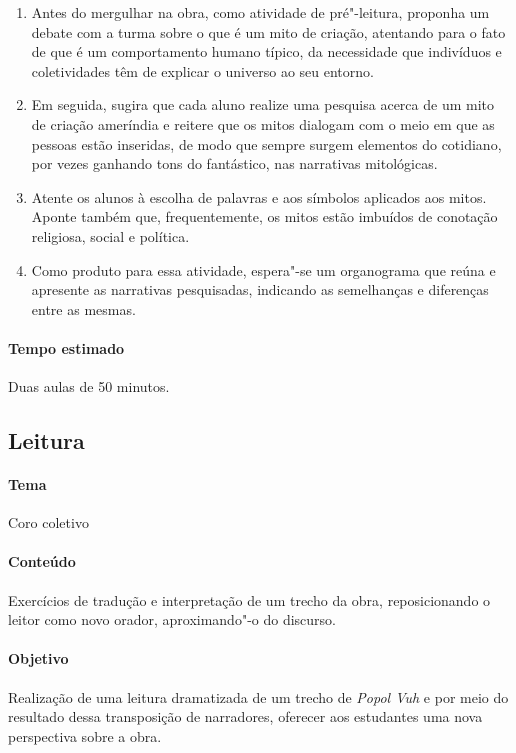 \documentclass[11pt]{extarticle}
\begin{document}
\begin{enumerate}
\item
Antes do mergulhar na obra, como atividade de pré"-leitura, proponha um debate 
com a turma sobre o que é um mito de criação, atentando para o fato de que é um 
comportamento humano típico, da necessidade que indivíduos e coletividades têm de
explicar o universo ao seu entorno.

\item
Em seguida, sugira que cada aluno realize uma pesquisa acerca de um mito de criação ameríndia 
e reitere que os mitos dialogam com o meio em que as pessoas estão 
inseridas, de modo que sempre surgem elementos do cotidiano, por vezes 
ganhando tons do fantástico, nas narrativas mitológicas.

\item
Atente os alunos à escolha de palavras e aos símbolos aplicados 
aos mitos. Aponte também que, frequentemente, os mitos estão imbuídos de conotação 
religiosa, social e política.

\item
Como produto para essa atividade, espera"-se um organograma que reúna e 
apresente as narrativas pesquisadas, indicando as semelhanças e diferenças
entre as mesmas.

\end{enumerate}

\paragraph{Tempo estimado} Duas aulas de 50 minutos. 

\subsection{Leitura}

\paragraph{Tema} Coro coletivo

\paragraph{Conteúdo} Exercícios de tradução e interpretação de um trecho da obra, 
reposicionando o leitor como novo orador, aproximando"-o do discurso.

\paragraph{Objetivo} Realização de uma leitura dramatizada de um trecho de \emph{Popol Vuh} 
e por meio do resultado dessa transposição de narradores, oferecer aos estudantes 
uma nova perspectiva sobre a obra. 
\end{document}
